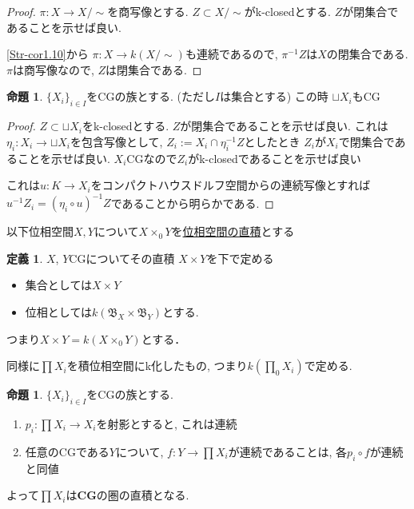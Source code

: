 \documentclass[dvipdfmx,a4paper,11pt]{article}
\theoremstyle{definition}
\newtheorem{prop}[thm]{命題}
\newtheorem{dfn}[thm]{定義}
\begin{document}
\begin{proof}
$\pi : X \to X/\sim$を商写像とする. 
$Z \subset X/\sim$がk-closedとする. $Z$が閉集合であることを示せば良い.

\ref{Str-cor1.10}から
$\pi : X \to k(X/\sim)$も連続であるので, $\pi^{-1}Z$は$X$の閉集合である.
$\pi$は商写像なので, $Z$は閉集合である. 
\end{proof}

 \begin{tcolorbox}
 [colback = white, colframe = green!35!black, fonttitle = \bfseries,breakable = true]
\begin{prop}\cite[Prop2.2]{Str}
\label{Str-prop2.2}
$\{ X_i \}_{i \in I}$をCGの族とする. (ただし$I$は集合とする)
この時
$\sqcup X_i$もCG
\end{prop}
\end{tcolorbox}
\begin{proof}
$Z \subset \sqcup X_i$をk-closedとする.
$Z$が閉集合であることを示せば良い. 
これは$\eta_i : X_i \to \sqcup X_i$を包含写像として, $Z_i := X_i \cap \eta_{i}^{-1}Z$としたとき
$Z_i$が$X_i$で閉集合であることを示せば良い.
$X_i$CGなので$Z_i$がk-closedであることを示せば良い

これは$u : K \to X_i$をコンパクトハウスドルフ空間からの連続写像とすれば
$u^{-1}Z_i = (\eta_i \circ u)^{-1}Z$であることから明らかである. 
\end{proof}

以下位相空間$X,Y$について$X \times_0 Y$を\underline{位相空間の直積}とする
 \begin{tcolorbox}
 [colback = white, colframe = green!35!black, fonttitle = \bfseries,breakable = true]
\begin{dfn}\cite[Def 2.3]{Str}
\label{Str-def-2.3}
$X$, $Y$CGについてその直積
$X \times Y$を下で定める
\begin{itemize}
\item 集合としては$X \times Y$
\item 位相としては$k(\mathfrak{B}_X \times \mathfrak{B}_Y)$とする.
\end{itemize}
つまり$X \times Y = k(X \times_0 Y)$とする． 

同様に$\prod X_i$を積位相空間にk化したもの, つまり$k(\prod_0 X_i)$で定める. 
\end{dfn}
\end{tcolorbox}

 \begin{tcolorbox}
 [colback = white, colframe = green!35!black, fonttitle = \bfseries,breakable = true]
\begin{prop}\cite[Prop2.4]{Str}
$\{ X_i \}_{i \in I}$をCGの族とする.
\begin{enumerate}
\item $p_i : \prod X_i \to X_i$を射影とすると, これは連続
\item 任意のCGである$Y$について, $f : Y \to \prod X_i $が連続であることは, 各$p_i \circ f $が連続と同値
\end{enumerate}
よって$\prod X_i$は{\bf CG}の圏の直積となる.
\end{prop}
\end{tcolorbox}
\end{document}
